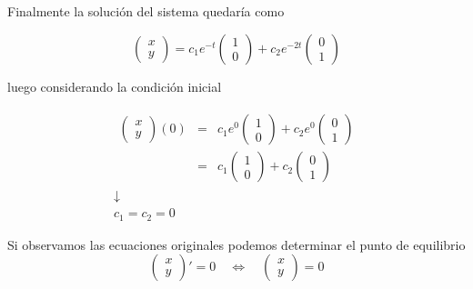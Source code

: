 \documentclass[10pt,letterpaper,titlepage]{article}
\begin{document}
Finalmente la solución del sistema quedaría como

\[
	\left(\begin{matrix}
		x \\
		y
	\end{matrix}\right) = c_1 e^{-t}\left(\begin{matrix}
		1 \\
		0
	\end{matrix}\right) + c_2 e^{-2t}\left(\begin{matrix}
		0 \\
		1
	\end{matrix}\right)
\]

luego considerando la condición inicial

\[
	\begin{array}{c}
		\begin{array}{rcl}
			\left(\begin{matrix}
				x \\
				y
			\end{matrix}\right)(0) & = & c_1 e^0 \left(\begin{matrix}
				1 \\
				0
			\end{matrix}\right) + c_2 e^0 \left(\begin{matrix}
				0 \\
				1
			\end{matrix}\right) \\
			& = & c_1 \left(\begin{matrix}
				1 \\
				0
			\end{matrix}\right) + c_2 \left(\begin{matrix}
				0 \\
				1
			\end{matrix}\right)
		\end{array} \\
		\downarrow \\
		c_1 = c_2 = 0
	\end{array}
\]

Si observamos las ecuaciones originales podemos determinar el punto de equilibrio
\[
	\left(\begin{matrix}
		x \\
		y
	\end{matrix}\right)' = 0 \quad\Leftrightarrow\quad \left(\begin{matrix}
		x \\
		y
	\end{matrix}\right) = 0
\]
\end{document}
